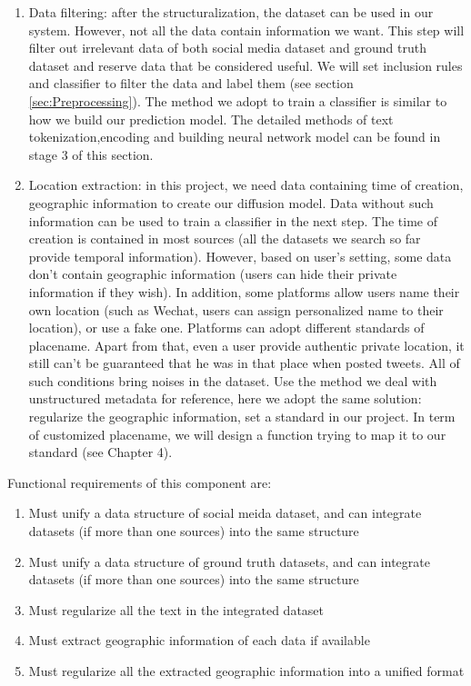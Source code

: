 \begin{enumerate}
    \item Data filtering: after the structuralization, the dataset can be used in our system. However, not all the data contain information we want. This step will filter out irrelevant data of both social media dataset and ground truth dataset and reserve data that be considered useful. We will set inclusion rules and classifier to filter the data and label them (see section \ref{sec:Preprocessing}). The method we adopt to train a classifier is similar to how we build our prediction model. The detailed methods of text tokenization,encoding and building neural network model can be found in stage 3 of this section.
    \item Location extraction: in this project, we need data containing time of creation, geographic information to create our diffusion model. Data without such information can be used to train a classifier in the next step. The time of creation is contained in most sources (all the datasets we search so far provide temporal information). However, based on user's setting, some data don't contain geographic information (users can hide their private information if they wish). In addition, some platforms allow users name their own location (such as Wechat, users can assign personalized name to their location), or use a fake one. Platforms can adopt different standards of placename. Apart from that, even a user provide authentic private location, it still can't be guaranteed that he was in that place when posted tweets. All of such conditions bring noises in the dataset. Use the method we deal with unstructured metadata for reference, here we adopt the same solution: regularize the geographic information, set a standard in our project. In term of customized placename, we will design a function trying to map it to our standard (see Chapter 4). 
\end{enumerate}
Functional requirements of this component are:
\begin{enumerate}
    \item Must unify a data structure of social meida dataset, and can integrate datasets (if more than one sources) into the same structure
    \item Must unify a data structure of ground truth datasets, and can integrate datasets (if more than one sources) into the same structure
    \item Must regularize all the text in the integrated dataset
    \item Must extract geographic information of each data if available
    \item Must regularize all the extracted geographic information into a unified format
\end{enumerate}
